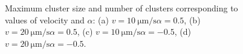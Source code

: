 \documentclass[../../master_thesis_np.tex]{subfiles}
\begin{document}
		\begin{figure}[htp]
			\centering\
			\\
			\\
			
			\caption{Maximum cluster size and number of clusters corresponding to values of velocity and $\alpha$: (a) $v = \SI{10}{\um \per \second} \alpha = 0.5$, (b) $v = \SI{20}{\um \per \second} \alpha = 0.5$, (c) $v = \SI{10}{\um \per \second} \alpha = -0.5$, (d) $v = \SI{20}{\um \per \second} \alpha = -0.5$.}
			\label{fig:lj_velocity_cluster}
		\end{figure}
		
\end{document}

